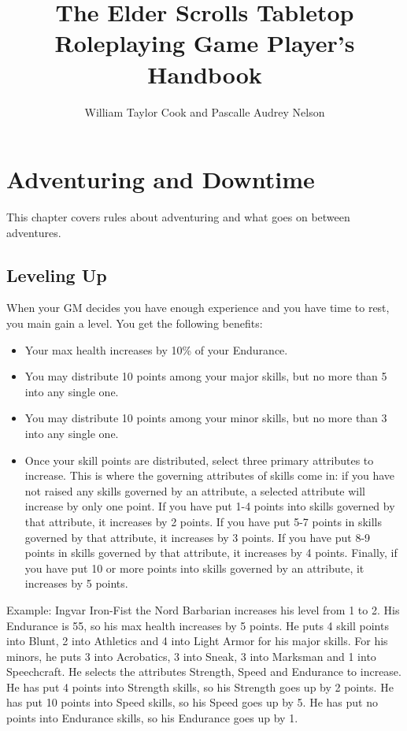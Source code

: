 \documentclass[12pt]{book}
\title{The Elder Scrolls Tabletop Roleplaying Game Player's Handbook}
\author{William Taylor Cook and Pascalle Audrey Nelson}
\begin{document}
\maketitle



\tableofcontents









\chapter{Adventuring and Downtime}
This chapter covers rules about adventuring and what goes on between adventures.

\section{Leveling Up}
When your GM decides you have enough experience and you have time to rest, you main gain a level. You get the following benefits:

\begin{itemize}
	\item Your max health increases by 10\% of your Endurance.
	\item You may distribute 10 points among your major skills, but no more than 5 into any single one.
	\item You may distribute 10 points among your minor skills, but no more than 3 into any single one.
	\item Once your skill points are distributed, select three primary attributes to increase. This is where the governing attributes of skills come in: if you have not raised any skills governed by an attribute, a selected attribute will increase by only one point. If you have put 1-4 points into skills governed by that attribute, it increases by 2 points. If you have put 5-7 points in skills governed by that attribute, it increases by 3 points. If you have put 8-9 points in skills governed by that attribute, it increases by 4 points. Finally, if you have put 10 or more points into skills governed by an attribute, it increases by 5 points.
\end{itemize}

Example: Ingvar Iron-Fist the Nord Barbarian increases his level from 1 to 2. His Endurance is 55, so his max health increases by 5 points. He puts 4 skill points into Blunt, 2 into Athletics and 4 into Light Armor for his major skills. For his minors, he puts 3 into Acrobatics, 3 into Sneak, 3 into Marksman and 1 into Speechcraft. He selects the attributes Strength, Speed and Endurance to increase. He has put 4 points into Strength skills, so his Strength goes up by 2 points. He has put 10 points into Speed skills, so his Speed goes up by 5. He has put no points into Endurance skills, so his Endurance goes up by 1.
\end{document}
